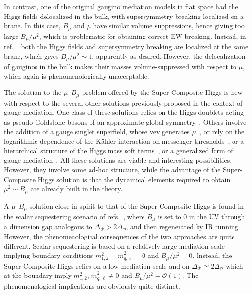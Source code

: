 \documentclass[a4paper,12pt]{article}
\def\O{\mathcal{O}}
\def\R{\mathcal{R}}
\begin{document}
In contrast, one of the original gaugino mediation models in flat space 
\cite{Chacko:1999mi} had the Higgs fields delocalized in the bulk, with supersymmetry breaking localized on a brane. In this case,  $B_\mu$ and $\mu$ have similar volume suppressions, hence giving too large $B_\mu / \mu^2$, which is problematic for obtaining correct EW breaking. 
Instead, in ref.~\cite{Okada:2011ed}, both the Higgs fields and supersymmetry breaking are localized at 
the same brane, which gives $B_\mu / \mu^2 \sim 1$, apparently as desired. However, the delocalization of gauginos in the bulk makes their masses volume-suppressed 
with respect to $\mu$, which again is phenomenologically unacceptable.

The solution to the $\mu$--$B_\mu$ problem offered by the Super-Composite Higgs is new with respect to the several other solutions previously proposed in the context of gauge mediation. One class of these solutions relies on the Higgs doublets acting as pseudo-Goldstone bosons of an approximate global symmetry~\cite{Dvali:1996cu}. Others  involve the addition of a gauge singlet superfield, whose vev  generates $\mu$~\cite{deGouvea:1997cx,Chacko:2001km,Delgado:2007rz}, or rely on the logarithmic dependence of the K\"ahler interaction on messenger thresholds~\cite{Giudice:2007ca}, or a hierarchical structure of the Higgs mass soft terms~\cite{Csaki:2008sr,DeSimone:2011va}, or a generalized form of gauge mediation~\cite{Komargodski:2008ax}. All these solutions are viable and interesting possibilities. However, they involve some ad-hoc structure, while the advantage of the Super-Composite Higgs solution is that the dynamical elements required to obtain $\mu^2 \sim B_\mu$ are already built in the theory.

A $\mu$--$B_\mu$ solution close in spirit to that  of the Super-Composite Higgs is found in  the scalar sequestering scenario
of refs.~\cite{Roy:2007nz,Murayama:2007ge,Perez:2008ng}, where $B_\mu$ is set to $0$  in the UV through a dimension gap analogous to $\Delta_\R> 2\Delta_\O$, and then regenerated by IR running. However, the phenomenological consequences of the two approaches are quite different. Scalar-sequestering  is based on  a relatively large mediation scale implying boundary conditions $m_{1,2}^2 ={\tilde m}_{q,\ell}^2=0$ and $B_\mu /\mu^2 =0$. Instead, the Super-Composite Higgs  relies on a low mediation scale and on $\Delta_\R\simeq 2\Delta_\O$ which at the boundary imply  $m_{1,2}^2$, ${\tilde m}_{q,\ell}^2\ne 0$ and $B_\mu /\mu^2 =\O (1)$. The phenomenological implications are obviously quite distinct.
\end{document}
